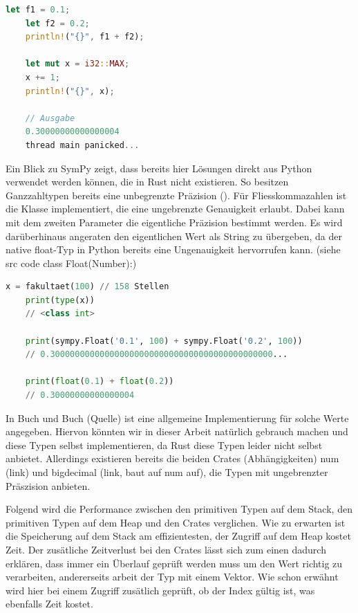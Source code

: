 \documentclass[11pt,a4paper, ngerman]{article}
\begin{document}
\begin{lstlisting}[language=rust, caption={Überlauf und Ungenauigkeit}]
    let f1 = 0.1;
    let f2 = 0.2;
    println!("{}", f1 + f2);

    let mut x = i32::MAX;
    x += 1;
    println!("{}", x);

    // Ausgabe
    0.30000000000000004
    thread main panicked...
\end{lstlisting}

Ein Blick zu SymPy zeigt, dass bereits hier Lösungen direkt aus Python verwendet werden können, die in Rust nicht existieren. So besitzen Ganzzahltypen bereits eine unbegrenzte Präzision (\cite{PythonDocuIntPrecision}). Für Fliesskommazahlen ist die Klasse  implementiert, die eine ungebrenzte Genauigkeit erlaubt. Dabei kann mit dem zweiten Parameter die eigentliche Präzision bestimmt werden. Es wird darüberhinaus angeraten den eigentlichen Wert als String zu übergeben, da der native float-Typ in Python bereits eine Ungenauigkeit hervorrufen kann. (siehe src code class Float(Number):)

\begin{lstlisting}[language=Python, caption={SymPy Precision}]
    x = fakultaet(100) // 158 Stellen
    print(type(x))
    // <class int>

    print(sympy.Float('0.1', 100) + sympy.Float('0.2', 100))
    // 0.300000000000000000000000000000000000000000000...

    print(float(0.1) + float(0.2))
    // 0.30000000000000004
\end{lstlisting}

In Buch und Buch (Quelle) ist eine allgemeine Implementierung für solche Werte angegeben. Hiervon könnten wir in dieser Arbeit natürlich gebrauch machen und diese Typen selbst implementieren, da Rust diese Typen leider nicht selbst anbietet. Allerdings existieren bereits die beiden Crates (Abhängigkeiten) num (link) und bigdecimal (link, baut auf num auf), die Typen mit ungebrenzter Präszision anbieten.

Folgend wird die Performance zwischen den primitiven Typen auf dem Stack, den primitiven Typen auf dem Heap und den Crates verglichen. Wie zu erwarten ist die Speicherung auf dem Stack am effizientesten, der Zugriff auf dem Heap kostet Zeit. Der zusätliche Zeitverlust bei den Crates lässt sich zum einen dadurch erklären, dass immer ein Überlauf geprüft werden muss um den Wert richtig zu verarbeiten, andererseits arbeit der Typ  mit einem Vektor. Wie schon erwähnt wird hier bei einem Zugriff zusätlich geprüft, ob der Index gültig ist, was ebenfalls Zeit kostet.
\end{document}
